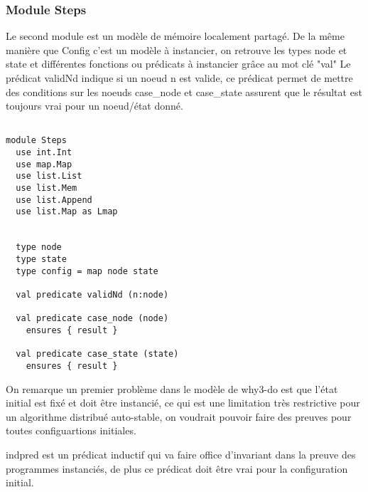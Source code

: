 \documentclass[11pt]{article}
\begin{document}
\subsubsection{Module Steps}
\label{sec:orga02fa3e}

Le second module est un modèle de mémoire localement partagé.
De la même manière que Config c'est un modèle à instancier,
on retrouve les types node et state et différentes fonctions ou prédicats à instancier grâce au mot clé "val" 
Le prédicat validNd indique si un noeud n est valide, ce prédicat permet de mettre des conditions sur les noeuds 
case\_node et case\_state assurent que le résultat est toujours vrai pour un noeud/état donné.
\lstset{language=why3,label= ,caption= ,captionpos=b,numbers=none}
\begin{lstlisting}

module Steps
  use int.Int
  use map.Map
  use list.List
  use list.Mem
  use list.Append
  use list.Map as Lmap


  type node
  type state
  type config = map node state

  val predicate validNd (n:node)

  val predicate case_node (node)
    ensures { result }

  val predicate case_state (state)
    ensures { result }

\end{lstlisting}

On remarque un premier problème dans le modèle de why3-do est que l'état initial est fixé et 
doit être instancié, ce qui est une limitation très restrictive pour un algorithme distribué auto-stable,
on voudrait pouvoir faire des preuves pour toutes configuartions initiales.

indpred est un prédicat inductif qui va faire office d'invariant dans la preuve des programmes instanciés, 
de plus ce prédicat doit être vrai pour la configuration initial. 
\end{document}

